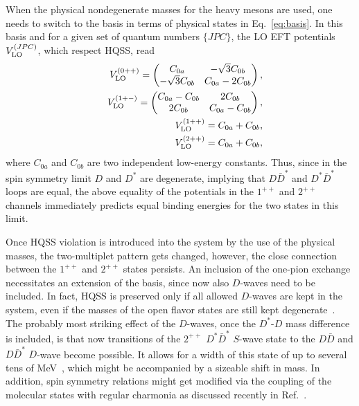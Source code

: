 When the physical nondegenerate masses for the heavy mesons are used, one needs 
to switch to the basis in terms of physical states in Eq.~\eqref{eq:basis}.
 In this basis and for a given set of quantum numbers $\{JPC\}$, the LO EFT
 potentials $V^{(JPC)}_{\rm LO}$, which respect HQSS,
 read~\cite{AlFiky:2005jd,Nieves:2012tt,Valderrama:2012jv}
\begin{eqnarray}\label{C0++}
&&V_{\rm LO}^{(0{++})}=
\begin{pmatrix}
C_{0a} & -\sqrt{3}C_{0b} \\
-\sqrt{3}C_{0b} & C_{0a}-2C_{0b}
\end{pmatrix},
\label{Vct0++}\\
&&V_{\rm LO}^{(1{+-})}=
\begin{pmatrix}
C_{0a}-C_{0b} & 2C_{0b} \\
2C_{0b} & C_{0a}-C_{0b}
\end{pmatrix},
\label{Vct1+-}\\
&&V_{\rm LO}^{(1{++})}=C_{0a}+C_{0b} \label{eq:contact2-a},\label{Vct1++} \\
&&V_{\rm LO}^{(2{++})}=C_{0a}+C_{0b} \label{eq:contact2-b},\label{Vct2++}
\end{eqnarray}
where $C_{0a}$ and $C_{0b}$ are two independent low-energy constants.
Thus, since in the spin symmetry limit $D$ and $D^*$ are degenerate, implying
that $D\bar D^*$ and $D^*\bar D^*$ loops are equal, the above equality of the
potentials in the $1^{++}$ and $2^{++}$ channels immediately predicts equal
binding energies for the two states in this limit.
 
 
Once HQSS violation is introduced into the system by the use of the
physical masses, the
two-multiplet pattern gets changed, however, the close connection between the
$1^{++}$ and $2^{++}$ states persists.
An inclusion of the one-pion exchange necessitates an extension of the basis, 
since now also $D$-waves need to be included. In fact, HQSS is preserved
only if all allowed $D$-waves are kept in the system, even if the
masses of the open flavor states are still kept degenerate~\cite{Baru:2016iwj}.
The probably most striking effect of
the $D$-waves, once the $D^*$-$D$ mass difference is included, is
that now transitions of the $2^{++}$ $D^*\bar D^*$ $S$-wave state to the
$D\bar D$ and $D\bar D^*$ $D$-wave become possible. It allows for a width of
this state of up to several tens of MeV~\cite{Albaladejo:2015dsa,Baru:2016iwj}, 
which might be accompanied by a sizeable shift in mass.
In addition, spin symmetry relations might get modified via the
coupling of the molecular states with regular charmonia as discussed recently
in Ref.~\cite{Cincioglu:2016fkm}.
 
